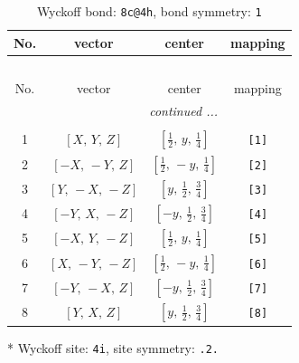 \documentclass[fleqn,8pt]{jsarticle}
\begin{document}
\renewcommand{\arraystretch}{1.2}
\begin{longtable}{cccc}
\caption{Wyckoff bond: {\tt 8c@4h}, bond symmetry: {\tt 1}}
 \\
 \hline \hline
No. & vector & center & mapping \\ \hline \endfirsthead

\multicolumn{3}{l}{\tablename\ \thetable{}} \\
 \hline \hline
No. & vector & center & mapping \\ \hline \endhead

 \hline \hline
\multicolumn{3}{r}{\footnotesize\it continued ...} \\ \endfoot

 \hline \hline
\multicolumn{3}{r}{} \\ \endlastfoot

1 & $\left[ X,\, Y,\, Z \right]$ & $\left[ \frac{1}{2},\, y,\, \frac{1}{4} \right]$ & {\tt [1]} \\ \hline
2 & $\left[ - X,\, - Y,\, Z \right]$ & $\left[ \frac{1}{2},\, - y,\, \frac{1}{4} \right]$ & {\tt [2]} \\ \hline
3 & $\left[ Y,\, - X,\, - Z \right]$ & $\left[ y,\, \frac{1}{2},\, \frac{3}{4} \right]$ & {\tt [3]} \\ \hline
4 & $\left[ - Y,\, X,\, - Z \right]$ & $\left[ - y,\, \frac{1}{2},\, \frac{3}{4} \right]$ & {\tt [4]} \\ \hline
5 & $\left[ - X,\, Y,\, - Z \right]$ & $\left[ \frac{1}{2},\, y,\, \frac{1}{4} \right]$ & {\tt [5]} \\ \hline
6 & $\left[ X,\, - Y,\, - Z \right]$ & $\left[ \frac{1}{2},\, - y,\, \frac{1}{4} \right]$ & {\tt [6]} \\ \hline
7 & $\left[ - Y,\, - X,\, Z \right]$ & $\left[ - y,\, \frac{1}{2},\, \frac{3}{4} \right]$ & {\tt [7]} \\ \hline
8 & $\left[ Y,\, X,\, Z \right]$ & $\left[ y,\, \frac{1}{2},\, \frac{3}{4} \right]$ & {\tt [8]} \\
\end{longtable}
* Wyckoff site: {\tt 4i}, site symmetry: {\tt .2.}
\renewcommand{\arraystretch}{1.2}
\end{document}
